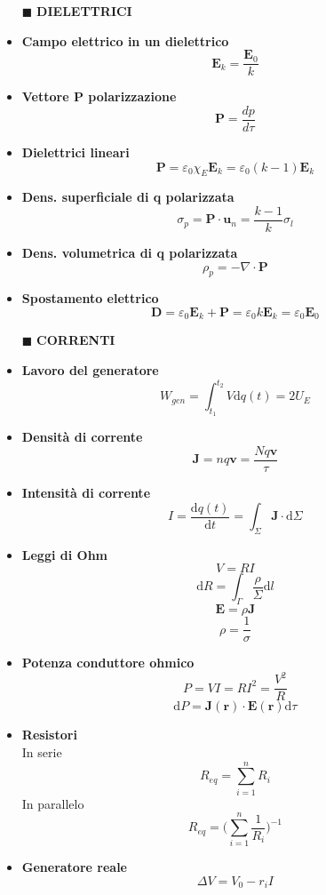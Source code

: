 \documentclass{book}
\newcommand{\g}{\textbf}
\newcommand{\h}{\mathbf}
\newcommand{\e}{\begin{equation}}
\newcommand{\ex}{\end{equation} }
\renewcommand{\it}{\item[$\cdot$]}
\begin{document}
\begin{multicols}{4}
\begin{itemize}
\item [$\blacksquare$] \g{DIELETTRICI}
    \it \g{Campo elettrico in un dielettrico}
        \e{\h{E}_k=\frac{\h{E}_0}{k}} \ex
    \it \g{Vettore P polarizzazione}
        \e{\h{P}=\frac{dp}{d\tau}} \ex
    \it \g{Dielettrici lineari}
        \e{\h{P}=\varepsilon_0\chi_E \h{E}_k=\varepsilon_0(k-1)\h{E}_k} \ex
    \it \g{Dens. superficiale di q polarizzata}
        \e{\sigma_p=\h{P}\cdot\h{u}_n=\frac{k-1}{k}\sigma_l} \ex
    \it \g{Dens. volumetrica di q polarizzata}
        \e{\rho_p=-\nabla\cdot\h{P}} \ex
    \it \g{Spostamento elettrico}
        \e{\h{D}=\varepsilon_0 \h{E}_k+\h{P}=\varepsilon_0 k \h{E}_k=\varepsilon_0 \h{E}_0} \ex

\item [$\blacksquare$] \g{CORRENTI}
    \it \g{Lavoro del generatore}
        \e{W_{gen}=\int_{t_1}^{t_2} V \mathrm{d}q(t)=2U_E} \ex
    \it \g{Densità di corrente}
        \e{\h{J}=nq\h{v}=\frac{Nq\h{v}}{\tau}} \ex
    \it \g{Intensità di corrente}
        \e{I=\frac{\mathrm{d} q(t)}{\mathrm{d} t}=\int_\Sigma \h{J}\cdot \mathrm{d}\Sigma} \ex
    \it \g{Leggi di Ohm}
        \e{V=RI} \ex
        \e{\mathrm{d}R=\int_\Gamma\frac{\rho}{\Sigma}\mathrm{d}l} \ex
        \e{\h{E}=\rho\h{J}} \ex
        \e{\rho=\frac{1}{\sigma}} \ex
    \it \g{Potenza conduttore ohmico}
        \e{P=VI=RI^2=\frac{V^2}{R}} \ex
        \e{\mathrm{d}P=\h{J}(\h{r})\cdot\h{E}(\h{r})\mathrm{d}\tau} \ex
    \it \g{Resistori} \\
        In serie
        \e{R_{eq}= \sum_{i=1}^n R_i} \ex
        In parallelo
        \e{R_{eq}=\biggl( \sum_{i=1}^n \frac{1}{R_i} \biggr)^{-1}} \ex
    \it \g{Generatore reale} \\
        \e{\Delta V=V_0-r_i I}\ex


\end{itemize}
\end{multicols}
\end{document}
